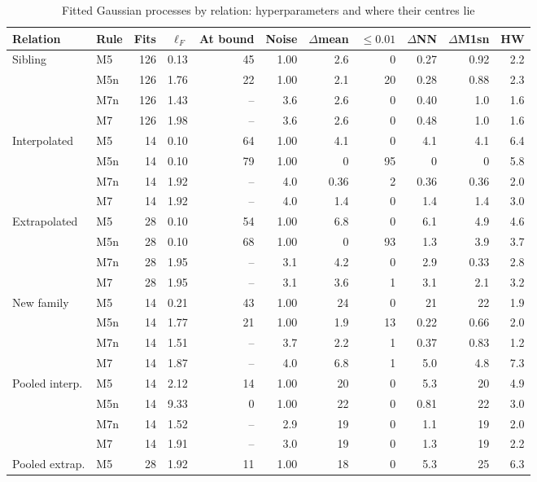 \documentclass[pdflatex,sn-basic]{sn-jnl}
\newcommand{\tabsizesmall}{\footnotesize}
\begin{document}
\begin{table}[p]
\tabsizesmall
\setlength{\tabcolsep}{3pt}
\caption{Fitted Gaussian processes by relation: hyperparameters and where their centres lie}\label{tab:s-gp}
\begin{tabular}{@{}llrrrrrrrrr@{}}
\toprule
Relation & Rule & Fits & $\ell_F$ & At bound & Noise & $\Delta$mean & ${\le}0.01$ & $\Delta$NN & $\Delta$M1sn & HW \\
\midrule
Sibling & M5 & 126 & 0.13 & 45 & 1.00 & 2.6 & 0 & 0.27 & 0.92 & 2.2 \\
 & M5n & 126 & 1.76 & 22 & 1.00 & 2.1 & 20 & 0.28 & 0.88 & 2.3 \\
 & M7n & 126 & 1.43 & -- & 3.6 & 2.6 & 0 & 0.40 & 1.0 & 1.6 \\
 & M7 & 126 & 1.98 & -- & 3.6 & 2.6 & 0 & 0.48 & 1.0 & 1.6 \\
Interpolated & M5 & 14 & 0.10 & 64 & 1.00 & 4.1 & 0 & 4.1 & 4.1 & 6.4 \\
 & M5n & 14 & 0.10 & 79 & 1.00 & 0 & 95 & 0 & 0 & 5.8 \\
 & M7n & 14 & 1.92 & -- & 4.0 & 0.36 & 2 & 0.36 & 0.36 & 2.0 \\
 & M7 & 14 & 1.92 & -- & 4.0 & 1.4 & 0 & 1.4 & 1.4 & 3.0 \\
Extrapolated & M5 & 28 & 0.10 & 54 & 1.00 & 6.8 & 0 & 6.1 & 4.9 & 4.6 \\
 & M5n & 28 & 0.10 & 68 & 1.00 & 0 & 93 & 1.3 & 3.9 & 3.7 \\
 & M7n & 28 & 1.95 & -- & 3.1 & 4.2 & 0 & 2.9 & 0.33 & 2.8 \\
 & M7 & 28 & 1.95 & -- & 3.1 & 3.6 & 1 & 3.1 & 2.1 & 3.2 \\
New family & M5 & 14 & 0.21 & 43 & 1.00 & 24 & 0 & 21 & 22 & 1.9 \\
 & M5n & 14 & 1.77 & 21 & 1.00 & 1.9 & 13 & 0.22 & 0.66 & 2.0 \\
 & M7n & 14 & 1.51 & -- & 3.7 & 2.2 & 1 & 0.37 & 0.83 & 1.2 \\
 & M7 & 14 & 1.87 & -- & 4.0 & 6.8 & 1 & 5.0 & 4.8 & 7.3 \\
Pooled interp. & M5 & 14 & 2.12 & 14 & 1.00 & 20 & 0 & 5.3 & 20 & 4.9 \\
 & M5n & 14 & 9.33 & 0 & 1.00 & 22 & 0 & 0.81 & 22 & 3.0 \\
 & M7n & 14 & 1.52 & -- & 2.9 & 19 & 0 & 1.1 & 19 & 2.0 \\
 & M7 & 14 & 1.91 & -- & 3.0 & 19 & 0 & 1.3 & 19 & 2.2 \\
Pooled extrap. & M5 & 28 & 1.92 & 11 & 1.00 & 18 & 0 & 5.3 & 25 & 6.3 \\

\end{tabular}
\end{table}
\end{document}
